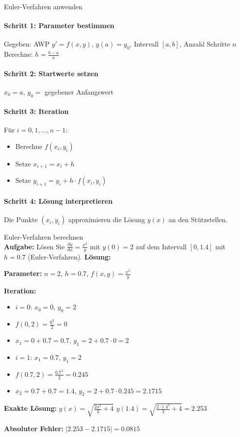 \begin{KR}{Euler-Verfahren anwenden}\\
\paragraph{Schritt 1: Parameter bestimmen}
Gegeben: AWP $y' = f(x,y)$, $y(a) = y_0$, Intervall $[a,b]$, Anzahl Schritte $n$
Berechne: $h = \frac{b-a}{n}$

\paragraph{Schritt 2: Startwerte setzen}
$x_0 = a$, $y_0 = $ gegebener Anfangswert

\paragraph{Schritt 3: Iteration}
Für $i = 0, 1, ..., n-1$:
\begin{itemize}
    \item Berechne $f(x_i, y_i)$
    \item Setze $x_{i+1} = x_i + h$
    \item Setze $y_{i+1} = y_i + h \cdot f(x_i, y_i)$
\end{itemize}

\paragraph{Schritt 4: Lösung interpretieren}
Die Punkte $(x_i, y_i)$ approximieren die Lösung $y(x)$ an den Stützstellen.
\end{KR}

\begin{example2}{Euler-Verfahren berechnen}\\
\textbf{Aufgabe:} Lösen Sie $\frac{dy}{dx} = \frac{x^2}{y}$ mit $y(0) = 2$ auf dem Intervall $[0, 1.4]$ mit $h = 0.7$ (Euler-Verfahren).
\tcblower
\textbf{Lösung:}

\textbf{Parameter:} $n = 2$, $h = 0.7$, $f(x,y) = \frac{x^2}{y}$

\textbf{Iteration:}
\begin{itemize}
    \item $i = 0$: $x_0 = 0$, $y_0 = 2$
    \item $f(0, 2) = \frac{0^2}{2} = 0$
    \item $x_1 = 0 + 0.7 = 0.7$, $y_1 = 2 + 0.7 \cdot 0 = 2$
\end{itemize}

\begin{itemize}
    \item $i = 1$: $x_1 = 0.7$, $y_1 = 2$
    \item $f(0.7, 2) = \frac{0.7^2}{2} = 0.245$
    \item $x_2 = 0.7 + 0.7 = 1.4$, $y_2 = 2 + 0.7 \cdot 0.245 = 2.1715$
\end{itemize}

\textbf{Exakte Lösung:} $y(x) = \sqrt{\frac{2x^3}{3} + 4}$
$y(1.4) = \sqrt{\frac{2 \cdot 1.4^3}{3} + 4} = 2.253$

\textbf{Absoluter Fehler:} $|2.253 - 2.1715| = 0.0815$
\end{example2}

